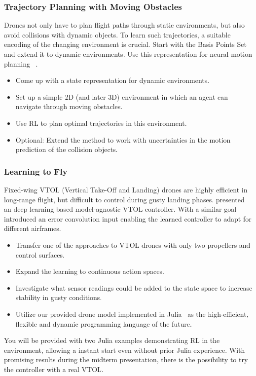 \documentclass[a4paper]{article}
\begin{document}
\subsubsection{Trajectory Planning with Moving Obstacles}
Drones not only have to plan flight paths through static environments, but also avoid collisions with dynamic objects.
To learn such trajectories, a suitable encoding of the changing environment is crucial.
Start with the Basis Points Set ~\citet{Prokudin2019} and extend it to dynamic environments.
Use this representation for neural motion planning ~\citet{Qureshi2019}.

\begin{itemize}
  \item Come up with a state representation for dynamic environments.
  \item Set up a simple 2D (and later 3D) environment in which an agent can navigate through moving obstacles.
  \item Use RL to plan optimal trajectories in this environment.
  \item Optional: Extend the method to work with uncertainties in the motion prediction of the collision objects.
\end{itemize}

\subsubsection{Learning to Fly}
Fixed-wing VTOL (Vertical Take-Off and Landing) drones are highly efficient in long-range flight, but difficult to control during gusty landing phases.
\citet{ModelAgnosticVTOL} presented an deep learning based model-agnostic VTOL controller. With a similar goal \citet{LearningToFly} introduced an error convolution input enabling the learned controller to adapt for different airframes.
\begin{itemize}
  \item Transfer one of the approaches to VTOL drones with only two propellers and control surfaces.
  \item Expand the learning to continuous action spaces.
  \item Investigate what sensor readings could be added to the state space to increase stability in gusty conditions.
  \item Utilize our provided drone model implemented in Julia~\cite{WebJulia} as the high-efficient, flexible and dynamic programming language of the future.
\end{itemize}
You will be provided with two Julia examples demonstrating RL in the environment, allowing a instant start even without prior Julia experience.
With promising results during the midterm presentation, there is the possibility to try the controller with a real VTOL. %
\end{document}
